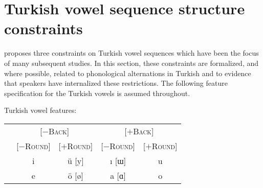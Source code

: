 \section{Turkish vowel sequence structure constraints}

\citet{Lees1966a,Lees1966b} proposes three constraints on Turkish vowel sequences which have been the focus of many subsequent studies. In this section, these constraints are formalized, and where possible, related to phonological alternations in Turkish and to evidence that speakers have internalized these restrictions. The following feature specification for the Turkish vowels is assumed throughout.

\begin{example}
Turkish vowel features:

\vspace{0.5\baselineskip}
\begin{tabular}{c | c c c c}
                       & \multicolumn{2}{c}{[$-$\textsc{Back}]} & \multicolumn{2}{c}{[$+$\textsc{Back}]} \\
                       & [$-$\textsc{Round}] & [$+$\textsc{Round}] & [$-$\textsc{Round}] & [$+$\textsc{Round}] \\ \midrule
{} & {i} & {ü} [y] & {ı} [ɯ] & {u} \\
 & {e} & {ö} [ø] & {a} [ɑ] & {o} \\
\end{tabular}
\end{example}




